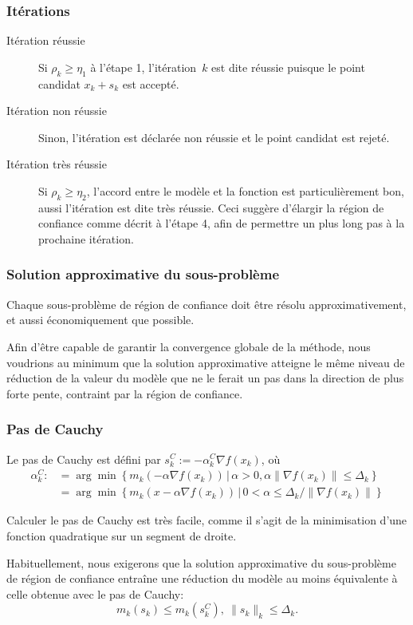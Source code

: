 \documentclass[t,usepdftitle=false]{beamer}
\begin{document}
\begin{frame}
\frametitle{Itérations}

\begin{description}
\item[Itération réussie]
Si $\rho_k \geq \eta_1$ à l'étape 1, l'itération~$k$ est dite réussie puisque le point candidat $x_k + s_k$ est accepté.
\item[Itération non réussie]
Sinon, l'itération est déclarée non réussie et le point candidat est rejeté. 
\item[Itération très réussie]
Si $\rho_k \geq \eta_2$, l'accord entre le modèle et la fonction est particulièrement bon, aussi l'itération est dite très réussie. Ceci suggère d'élargir la région de confiance comme décrit à l'étape 4, afin de permettre un plus long pas à la prochaine itération.
\end{description}
\end{frame}

\begin{frame}
\frametitle{Solution approximative du sous-problème}

Chaque sous-problème de région de confiance doit être résolu approximativement, et aussi économiquement que possible.

\mbox{}

Afin d'être capable de garantir la convergence globale de la méthode, nous voudrions au minimum que la solution approximative atteigne le même niveau de réduction de la valeur du modèle que ne le ferait un pas dans la direction de plus forte pente, contraint par la région de confiance.

\end{frame}

\begin{frame}
\frametitle{Pas de Cauchy}

Le pas de Cauchy est défini par $s_k^C := -\alpha_k^C \nabla f(x_k)$, où
\begin{align*}
\alpha_k^C :&= \arg\min
\left\{ m_k(-\alpha \nabla f(x_k)) \,|\, \alpha > 0, \alpha\| \nabla f(x_k) \| \leq \Delta_k \right\} \\
&= \arg\min \left\{ m_k(x-\alpha \nabla f(x_k)) \,|\, 0 < \alpha \leq  \Delta_k/\| \nabla f(x_k) \| \right\}
\end{align*}

\mbox{}

Calculer le pas de Cauchy est très facile, comme il s'agit de la minimisation d'une fonction quadratique sur un segment de droite.

\mbox{}

Habituellement, nous exigerons que la solution approximative du sous-problème de région de confiance entraîne une réduction du modèle au moins équivalente à celle obtenue avec le pas de Cauchy:
$$
m_k(s_k) \leq m_k(s_k^C),\ \| s_k \|_k \leq \Delta_k.
$$

\end{frame}
\end{document}
